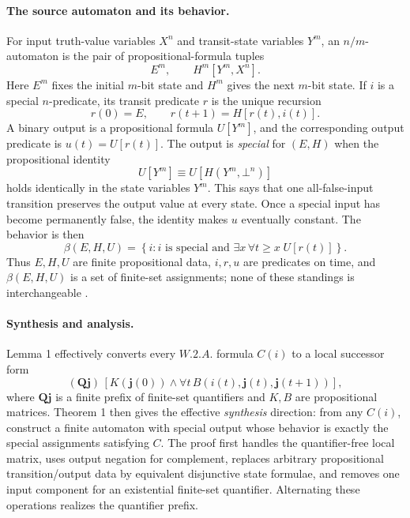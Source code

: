 \paragraph{The source automaton and its behavior.}
For input truth-value variables \(X^n\) and transit-state variables \(Y^m\),
an \(n/m\)-automaton is the pair of propositional-formula tuples
\[
 E^m,
 \qquad
 H^m[Y^m,X^n].
\]
Here \(E^m\) fixes the initial \(m\)-bit state and \(H^m\) gives the next
\(m\)-bit state.  If \(i\) is a special \(n\)-predicate, its transit predicate
\(r\) is the unique recursion
\[
 r(0)=E,
 \qquad
 r(t+1)=H[r(t),i(t)].
\]
A binary output is a propositional formula \(U[Y^m]\), and the corresponding
output predicate is \(u(t)=U[r(t)]\).  The output is \emph{special} for
\((E,H)\) when the propositional identity
\[
 U[Y^m]
 \equiv
 U[H(Y^m,\bot^n)]
\]
holds identically in the state variables \(Y^m\).  This says that one
all-false-input transition preserves the output value at every state.  Once a
special input has become permanently false, the identity makes \(u\)
eventually constant.
The behavior is then
\[
 \beta(E,H,U)
 =
 \left\{
   i:
   i\text{ is special and }
   \exists x\,\forall t\geq x\;U[r(t)]
 \right\}.
\]
Thus \(E,H,U\) are finite propositional data, \(i,r,u\) are predicates on
time, and \(\beta(E,H,U)\) is a set of finite-set assignments; none of these
standings is interchangeable \cite[pp.~6--8]{Buchi1959WeakReport}.

\paragraph{Synthesis and analysis.}
Lemma 1 effectively converts every \(W.2.A.\) formula \(C(i)\) to a local
successor form
\[
 (\mathbf Q\mathbf j)\,
 \left[
   K(\mathbf j(0))
   \land
   \forall t\,
   B(i(t),\mathbf j(t),\mathbf j(t+1))
 \right],
\]
where \(\mathbf Q\mathbf j\) is a finite prefix of finite-set quantifiers and
\(K,B\) are propositional matrices.  Theorem 1 then gives the effective
\emph{synthesis} direction: from any \(C(i)\), construct a finite automaton
with special output whose behavior is exactly the special assignments
satisfying \(C\).  The proof first handles the quantifier-free local matrix,
uses output negation for complement, replaces arbitrary propositional
transition/output data by equivalent disjunctive state formulae, and removes
one input component for an existential finite-set quantifier.  Alternating
these operations realizes the quantifier prefix.

